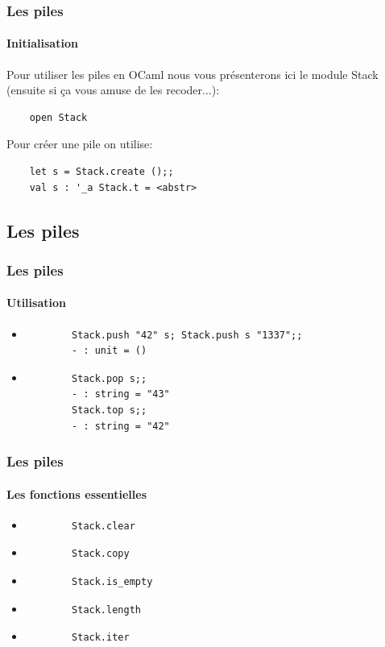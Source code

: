 \begin{frame}[fragile]
	\frametitle{Les piles}
	\framesubtitle{Initialisation}
	Pour utiliser les piles en OCaml nous vous présenterons ici le module Stack (ensuite si ça vous amuse de les recoder...):
	\begin{lstlisting}
	open Stack
	\end{lstlisting}
	Pour créer une pile on utilise:
	\begin{lstlisting}
	let s = Stack.create ();;
	val s : '_a Stack.t = <abstr>
	\end{lstlisting}
\end{frame}

\subsection{Les piles}
\begin{frame}[fragile]
\frametitle{Les piles}
\framesubtitle{Utilisation}
	\begin{itemize}
	
	\item
		\begin{lstlisting}
		Stack.push "42" s; Stack.push s "1337";;
		- : unit = ()	
		\end{lstlisting}	
	
	\item
		\begin{lstlisting}
		Stack.pop s;;
		- : string = "43"
		Stack.top s;;
		- : string = "42"
		\end{lstlisting}	

	\end{itemize}

\end{frame}

\begin{frame}[fragile]
\frametitle{Les piles}
\framesubtitle{Les fonctions essentielles}
	\begin{itemize}
	
	\item
		\begin{lstlisting}
		Stack.clear
		\end{lstlisting}

	\item
		\begin{lstlisting}
		Stack.copy
		\end{lstlisting}	

	\item
		\begin{lstlisting}
		Stack.is_empty
		\end{lstlisting}	

	\item
		\begin{lstlisting}
		Stack.length
		\end{lstlisting}	

	\item
		\begin{lstlisting}
		Stack.iter
		\end{lstlisting}

	\end{itemize}

\end{frame}

